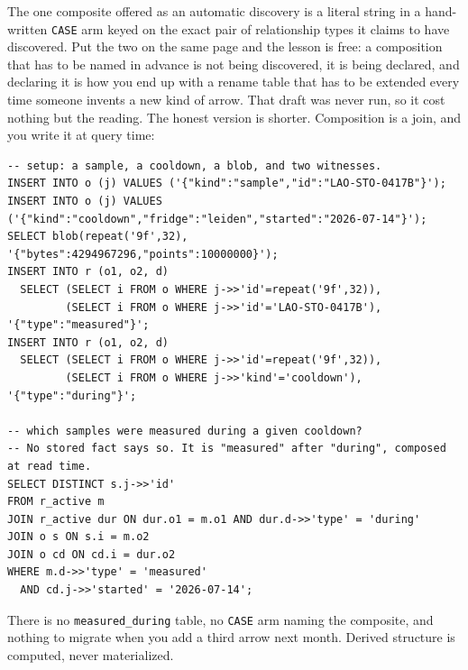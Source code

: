 The one composite offered as an automatic discovery is a literal string in a hand-written \texttt{CASE} arm keyed on the exact pair of relationship types it claims to have discovered. Put the two on the same page and the lesson is free: a composition that has to be named in advance is not being discovered, it is being declared, and declaring it is how you end up with a rename table that has to be extended every time someone invents a new kind of arrow. That draft was never run, so it cost nothing but the reading. The honest version is shorter. Composition is a join, and you write it at query time:

\begin{lstlisting}
-- setup: a sample, a cooldown, a blob, and two witnesses.
INSERT INTO o (j) VALUES ('{"kind":"sample","id":"LAO-STO-0417B"}');
INSERT INTO o (j) VALUES ('{"kind":"cooldown","fridge":"leiden","started":"2026-07-14"}');
SELECT blob(repeat('9f',32), '{"bytes":4294967296,"points":10000000}');
INSERT INTO r (o1, o2, d)
  SELECT (SELECT i FROM o WHERE j->>'id'=repeat('9f',32)),
         (SELECT i FROM o WHERE j->>'id'='LAO-STO-0417B'), '{"type":"measured"}';
INSERT INTO r (o1, o2, d)
  SELECT (SELECT i FROM o WHERE j->>'id'=repeat('9f',32)),
         (SELECT i FROM o WHERE j->>'kind'='cooldown'), '{"type":"during"}';

-- which samples were measured during a given cooldown?
-- No stored fact says so. It is "measured" after "during", composed at read time.
SELECT DISTINCT s.j->>'id'
FROM r_active m
JOIN r_active dur ON dur.o1 = m.o1 AND dur.d->>'type' = 'during'
JOIN o s ON s.i = m.o2
JOIN o cd ON cd.i = dur.o2
WHERE m.d->>'type' = 'measured'
  AND cd.j->>'started' = '2026-07-14';
\end{lstlisting}

There is no \texttt{measured\_during} table, no \texttt{CASE} arm naming the composite, and nothing to migrate when you add a third arrow next month. Derived structure is computed, never materialized.

